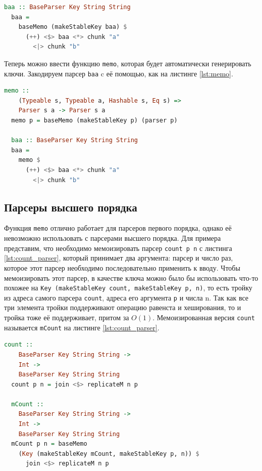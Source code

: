 \documentclass[times]{itmo-student-thesis}
\begin{document}
\begin{lstlisting}[language=Haskell,float=!h,caption={Пример использования makeStableKey},label={lst:makeStableKey_example}]
  baa :: BaseParser Key String String
  baa =
    baseMemo (makeStableKey baa) $
      (++) <$> baa <*> chunk "a"
        <|> chunk "b"
\end{lstlisting}

Теперь можно ввести функцию \lstinline{memo}, которая будет автоматически генерировать ключи. Закодируем парсер \lstinline{baa} c её
помощью, как на листинге \ref{lst:memo}.

\begin{lstlisting}[language=Haskell,float=!h,caption={Memo с автоматическим ключом},label={lst:memo}]
  memo :: 
    (Typeable s, Typeable a, Hashable s, Eq s) => 
    Parser s a -> Parser s a
  memo p = baseMemo (makeStableKey p) (parser p)

  baa :: BaseParser Key String String
  baa =
    memo $
      (++) <$> baa <*> chunk "a"
        <|> chunk "b"
\end{lstlisting}

\subsection{Парсеры высшего порядка}

Функция \lstinline{memo} отлично работает для парсеров первого порядка, однако её невозможно использовать с
парсерами высшего порядка. Для примера представим, что необходимо мемоизировать парсер
\lstinline{count p n} с листинга \ref{lst:count_parser}, который  принимает два аргумента: парсер и число раз,
которое этот парсер необходимо последовательно применить к вводу. Чтобы мемоизировать этот парсер, в качестве ключа
можно было бы использовать что-то похожее на \lstinline{Key (makeStableKey count, makeStableKey p, n)}, то есть тройку из
адреса самого парсера \lstinline{count}, адреса его аргумента \lstinline{p} и числа n. Так как все три элемента тройки поддерживают
операцию равенста и хеширования, то и тройка тоже её поддерживает, притом за $O(1)$. Мемоизированная версия \lstinline{count} называется \lstinline{mCount}
на листинге \ref{lst:count_parser}.

\begin{lstlisting}[language=Haskell,float=!h,caption={Парсер высшего порядка count},label={lst:count_parser}]
  count :: 
    BaseParser Key String String -> 
    Int -> 
    BaseParser Key String String
  count p n = join <$> replicateM n p

  mCount :: 
    BaseParser Key String String -> 
    Int -> 
    BaseParser Key String String
  mCount p n = baseMemo 
    (Key (makeStableKey mCount, makeStableKey p, n)) $ 
      join <$> replicateM n p
\end{lstlisting}
\end{document}
